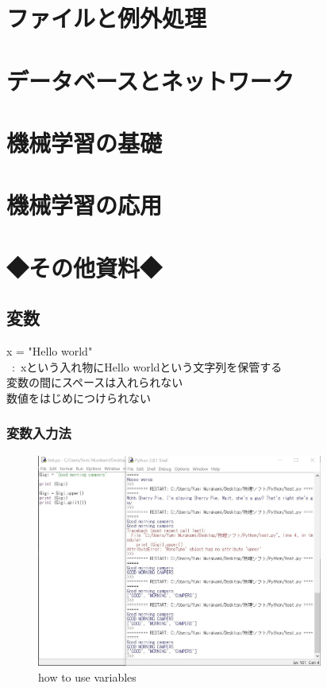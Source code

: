 \documentclass[11pt,a4paper]{jreport}
\begin{document}
\chapter{ファイルと例外処理}%

\chapter{データベースとネットワーク}%

\chapter{機械学習の基礎}%

\chapter{機械学習の応用}%




\chapter{◆その他資料◆}
\section{変数}
x = "Hello world"\\
\, :\, xという入れ物にHello worldという文字列を保管する\\
変数の間にスペースは入れられない\\
数値をはじめにつけられない
%
\subsection{変数入力法}

\begin{figure}[htbp]
 \begin{center}
  \includegraphics[clip,height=7.0cm]{how_to_use_variables.jpg}
  \caption{how to use variables}
  \label{variables}
 \end{center}
\end{figure}
\end{document}
